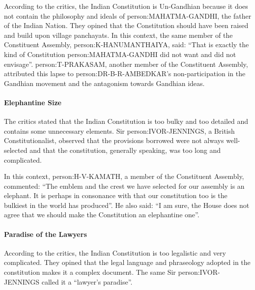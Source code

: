 \begin{multicol}{2}
According to the critics, the Indian Constitution is Un-Gandhian because it does not contain the philosophy and ideals of \gls{person:MAHATMA-GANDHI}, the father of the Indian Nation. They opined that the Constitution should have been raised and build upon village panchayats. In this context, the same member of the Constituent Assembly, \gls{person:K-HANUMANTHAIYA}, said: ``That is exactly the kind of Constitution \gls{person:MAHATMA-GANDHI} did not want and did not envisage''. \gls{person:T-PRAKASAM}, another member of the Constituent Assembly, attributed this lapse to \gls{person:DR-B-R-AMBEDKAR}'s non-participation in the Gandhian movement and the antagonism towards Gandhian ideas.

\paragraph{Elephantine Size}

The critics stated that the Indian Constitution is too bulky and too detailed and contains some unnecessary elements. Sir \gls{person:IVOR-JENNINGS}, a British Constitutionalist, observed that the provisions borrowed were not always well-selected and that the constitution, generally speaking, was too long and complicated.

In this context, \gls{person:H-V-KAMATH}, a member of the Constituent Assembly, commented: ``The emblem and the crest we have selected for our assembly is an elephant. It is perhaps in consonance with that our constitution too is the bulkiest in the world has produced''. He also said: ``I am sure, the House does not agree that we should make the Constitution an elephantine one''.

\paragraph{Paradise of the Lawyers}

According to the critics, the Indian Constitution is too legalistic and very complicated. They opined that the legal language and phraseology adopted in the constitution makes it a complex document. The same Sir \gls{person:IVOR-JENNINGS} called it a ``lawyer's paradise''.


\end{multicol}

